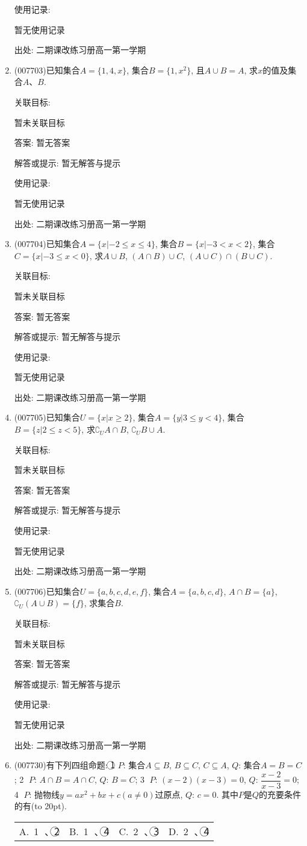 \documentclass[10pt,a4paper]{article}
\newcommand{\bracket}[1]{(\hbox to #1pt{})}
\newcommand{\fourch}[4]{\par\begin{tabular}{p{.23\textwidth}p{.23\textwidth}p{.23\textwidth}p{.23\textwidth}}
A.~#1 &B.~#2& C.~#3& D.~#4
\end{tabular}}
\begin{document}
\begin{enumerate}[1.]
使用记录:

暂无使用记录


出处: 二期课改练习册高一第一学期
\item { (007703)}已知集合$A=\{1,4,x\}$, 集合$B=\{1,x^2\}$, 且$A\cup B=A$, 求$x$的值及集合$A$、$B$.


关联目标:

暂未关联目标

答案: 暂无答案

解答或提示: 暂无解答与提示

使用记录:

暂无使用记录


出处: 二期课改练习册高一第一学期
\item { (007704)}已知集合$A=\{x|-2\le x\le 4\}$, 集合$B=\{x|-3<x<2\}$, 集合$C=\{x|-3\le x<0\}$, 求$A\cup B$, $(A\cap B)\cup C$, $(A\cup C)\cap (B\cup C)$.


关联目标:

暂未关联目标

答案: 暂无答案

解答或提示: 暂无解答与提示

使用记录:

暂无使用记录


出处: 二期课改练习册高一第一学期
\item { (007705)}已知集合$U=\{x|x\ge 2\}$, 集合$A=\{y|3\le y<4\}$, 集合$B=\{z|2\le z<5\}$, 求$\complement _UA\cap B$, $\complement _UB\cup A$.


关联目标:

暂未关联目标

答案: 暂无答案

解答或提示: 暂无解答与提示

使用记录:

暂无使用记录


出处: 二期课改练习册高一第一学期
\item { (007706)}已知集合$U=\{a,b,c,d,e,f\}$, 集合$A=\{a,b,c,d\}$, $A\cap B=\{a\}$, $\complement _U(A\cup B)=\{f\}$, 求集合$B$.


关联目标:

暂未关联目标

答案: 暂无答案

解答或提示: 暂无解答与提示

使用记录:

暂无使用记录


出处: 二期课改练习册高一第一学期
\item { (007730)}有下列四组命题:
\textcircled{1} $P$: 集合$A\subseteq B$, $B\subseteq C$, $C\subseteq A$, 		$Q$: 集合$A=B=C$;
\textcircled{2} $P$: $A\cap B=A\cap C$, 					$Q$: $B=C$;
\textcircled{3} $P$: $(x-2)(x-3)=0$, 				$Q$: $\dfrac{x-2}{x-3}=0$;
\textcircled{4} $P$: 抛物线$y=ax^2+bx+c(a\ne 0)$过原点, $Q$: $c=0$.
其中$P$是$Q$的充要条件的有\bracket{20}.
\fourch{\textcircled{1} 、\textcircled{2} }{\textcircled{1} 、\textcircled{4} }{\textcircled{2} 、\textcircled{3} }{\textcircled{2} 、\textcircled{4}}



\end{enumerate}
\end{document}
